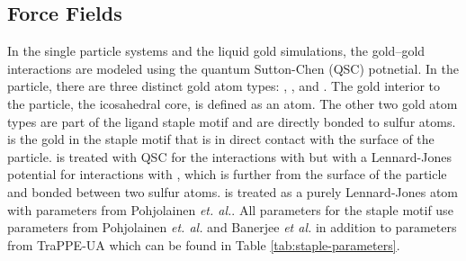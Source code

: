 \subsection{Force Fields}
In the single particle systems and the liquid gold simulations, the gold--gold interactions are modeled using the quantum Sutton-Chen (QSC) potnetial.\cite{Qi:1999ph}
In the  particle, there are three distinct gold atom types: , , and . 
The gold interior to the particle, the icosahedral core, is defined as an  atom.
The other two gold atom types are part of the ligand staple motif and are directly bonded to sulfur atoms.
 is the gold in the staple motif that is in direct contact with the surface of the particle. 
 is treated with QSC for the interactions with  but with a Lennard-Jones potential for interactions with , which is further from the surface of the particle and bonded between two sulfur atoms.
 is treated as a purely Lennard-Jones atom with parameters from Pohjolainen \textit{et. al.}.\cite{Pohjolainen2016}
All parameters for the staple motif use parameters from Pohjolainen \textit{et. al.}\cite{Pohjolainen2016} and Banerjee \textit{et al.}\cite{Banerjee2012} in addition to parameters from TraPPE-UA\cite{TraPPE-UA.alkanes,TraPPE-UA.alkylbenzenes} which can be found in Table \ref{tab:staple-parameters}.

